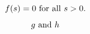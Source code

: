 \documentclass{sigma}
\begin{document}
\begin{equation}
f(s) = 0 $ for all $ s > 0.
\end{equation}
\begin{equation*} g $ and $ h \end{equation*}
\end{document}
